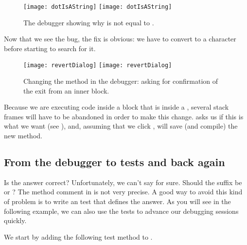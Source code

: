 \documentclass[a4paper,10pt,twoside]{book}
\begin{document}
\begin{figure}[btp]
	\begin{center}
	\ifluluelse
		{\texttt{[image: dotIsAString]}}
		{\texttt{[image: dotIsAString]}}
	\end{center}
	\caption{The debugger showing why  is not equal to .}
	\label{fig:dotIsAString}
\end{figure}

Now that we see the bug, the fix is obvious: we have to convert  to a character before starting to search for it.

\begin{figure}[btp]
	\begin{center}
	\ifluluelse
		{\texttt{[image: revertDialog]}}
		{\texttt{[image: revertDialog]}}
	\end{center}
	\caption{Changing the  method in the debugger: asking for confirmation of the exit from an inner block.}
	\label{fig:revertDialog}
\end{figure}

Because we are executing code inside a block that is inside a , several stack frames will have to be abandoned in order to make this change.
\sq asks us if this is what we want (see ), and, assuming that we click , will save (and compile) the new method.


\subsection{From the debugger to tests and back again}

Is the answer correct?
Unfortunately, we can't say for sure.
Should the suffix be  or ?
The method comment in  is not very precise.
A good way to avoid this kind of problem is to write an  test that defines the answer.
As you will see in the following example, we can also use the tests to advance our debugging sessions quickly.

We start by adding the following test method  to .
\end{document}
